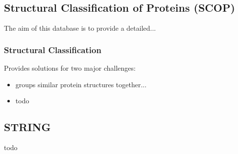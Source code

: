 \subsection{Structural Classification of Proteins (SCOP)}

The aim of this database is to provide a detailed...%

\subsubsection{Structural Classification}

Provides solutions for two major challenges:
\begin{itemize}
\item groups similar protein structures together...
\item todo
\end{itemize}

\subsection{STRING}

todo